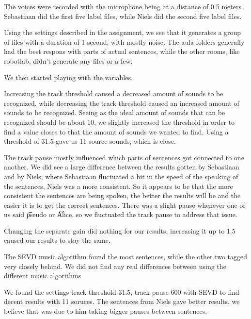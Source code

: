 
The voices were recorded with the microphone being at a distance of 0.5 meters. Sebastiaan did the first five label files, while Niels did the second five label files.

Using the settings described in the assignment, we see that it generates a group of files with a duration of 1 second, with mostly noise. The aula folders generally had the best respons with parts of actual sentences, while the other rooms, like robotlab, didn't generate any files or a few.

We then started playing with the variables.

Increasing the track threshold caused a decreased amount of sounds to be recognized, while decreasing the track threshold caused an increased amount of sounds to be recognized. Seeing as the ideal amount of sounds that can be recognized should be about 10, we slightly increased the threshold in order to find a value closes to that the amount of sounds we wanted to find. Using a threshold of 31.5 gave us 11 source sounds, which is close.

The track pause mostly influenced which parts of sentences got connected to one another. We did see a large difference between the results gotten by Sebastiaan and by Niels, where Sebastiaan fluctuated a bit in the speed of the speaking of the sentences, Niels was a more consistent. So it appears to be that the more consistent the sentences are being spoken, the better the results will be and the easier it is to get the correct sentences. There was a slight pause whenever one of us said \t{pseudo} or \t{Alice}, so we fluctuated the track pause to address that issue. 

Changing the separate gain did nothing for our results, increasing it up to 1.5 caused our results to stay the same.

The SEVD music algorithm found the most sentences, while the other two tagged very closely behind. We did not find any real differences between using the different music algorithms

We found the settings track threshold 31.5, track pause 600 with SEVD to find decent results with 11 soruces. The sentences from Niels gave better results, we believe that was due to him taking bigger pauses between sentences.